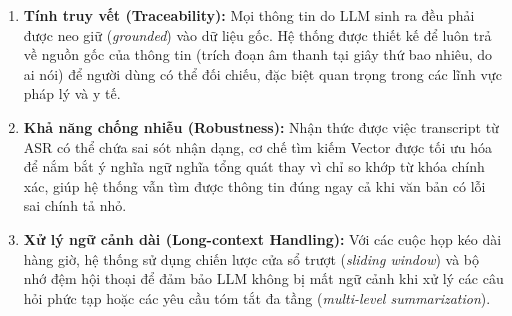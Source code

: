 \begin{enumerate}
    \item \textbf{Tính truy vết (Traceability):} Mọi thông tin do LLM sinh ra đều phải được neo giữ (\textit{grounded}) vào dữ liệu gốc. Hệ thống được thiết kế để luôn trả về nguồn gốc của thông tin (trích đoạn âm thanh tại giây thứ bao nhiêu, do ai nói) để người dùng có thể đối chiếu, đặc biệt quan trọng trong các lĩnh vực pháp lý và y tế.
    \item \textbf{Khả năng chống nhiễu (Robustness):} Nhận thức được việc transcript từ ASR có thể chứa sai sót nhận dạng, cơ chế tìm kiếm Vector được tối ưu hóa để nắm bắt ý nghĩa ngữ nghĩa tổng quát thay vì chỉ so khớp từ khóa chính xác, giúp hệ thống vẫn tìm được thông tin đúng ngay cả khi văn bản có lỗi sai chính tả nhỏ.
    \item \textbf{Xử lý ngữ cảnh dài (Long-context Handling):} Với các cuộc họp kéo dài hàng giờ, hệ thống sử dụng chiến lược cửa sổ trượt (\textit{sliding window}) và bộ nhớ đệm hội thoại để đảm bảo LLM không bị mất ngữ cảnh khi xử lý các câu hỏi phức tạp hoặc các yêu cầu tóm tắt đa tầng (\textit{multi-level summarization}).
\end{enumerate}